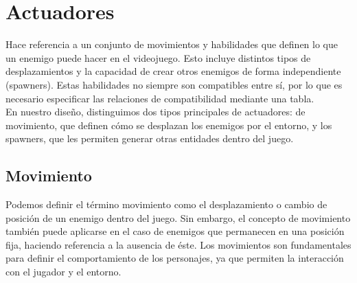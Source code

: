 \section{Actuadores}
\label{subsec:acciones}
Hace referencia a un conjunto de movimientos y habilidades que definen lo que un enemigo puede hacer en el videojuego. Esto incluye distintos tipos de desplazamientos y la capacidad de crear otros enemigos de forma independiente (spawners). Estas habilidades no siempre son 
compatibles entre sí, por lo que es necesario especificar las relaciones de compatibilidad mediante una tabla.\\

En nuestro diseño, distinguimos dos tipos principales de actuadores: de movimiento, que definen cómo se desplazan los enemigos por el entorno, y los spawners, que les permiten generar otras entidades dentro del juego.

\subsection{Movimiento}
Podemos definir el término movimiento como el desplazamiento o cambio de posición de un enemigo dentro del juego. Sin embargo, el concepto de movimiento también puede aplicarse en el caso de enemigos que permanecen en una posición fija, haciendo referencia a la ausencia de éste. Los movimientos son fundamentales para definir el comportamiento de los personajes, ya que permiten la interacción con el jugador y el entorno.\\

